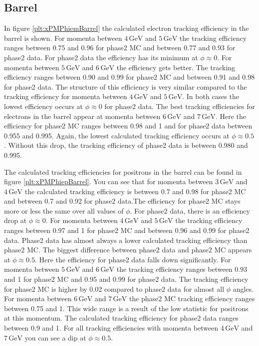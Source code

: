 \documentclass[a4paper,11pt,twosided,final,german,openbib,pdftex,listof=totoc,bibliography=totoc]{scrbook}
\begin{document}
\newpage



\subsection{Barrel}

In figure \ref{plt:xPMPhiemBarrel} the calculated electron tracking efficiency in the barrel is shown. For momenta between $4\,\textrm{GeV}$ and $5\,\textrm{GeV}$ the tracking efficiency ranges between 0.75 and 0.96 for phase2 MC and between 0.77 and 0.93 for phase2 data. For phase2 data the efficiency has its minimum at $\phi \approx 0$. For momenta between $5\,\textrm{GeV}$ and $6\,\textrm{GeV}$ the efficiency gets better. The tracking efficiency ranges between 0.90 and 0.99 for phase2 MC and between 0.91 and 0.98 for phase2 data. The structure of this efficiency is very similar compared to the tracking efficiency for momenta between $4\,\textrm{GeV}$ and $5\,\textrm{GeV}$. In both cases the lowest efficiency occurs at $\phi \approx 0$ for phase2 data. The best tracking efficiencies for electrons in the barrel appear at momenta between $6\,\textrm{GeV}$ and $7\,\textrm{GeV}$. Here the efficiency for phase2 MC ranges between 0.98 and 1 and for phase2 data between 0.955 and 0.995. Again, the lowest calculated tracking efficiency occurs at  $\phi \approx 0.5$. Without this drop, the tracking efficiency of phase2 data is between 0.980 and 0.995. 

The calculated tracking efficiencies for positrons in the barrel can be found in figure \ref{plt:xPMPhiepBarrel}. You can see that for momenta between $3\,\textrm{GeV}$ and $4\,\textrm{GeV}$ the calculated tracking efficiency is between 0.7 and 0.98 for phase2 MC and between 0.7 and 0.92 for phase2 data.The efficiency for phase2 MC stays more or less the same over all values of $\phi$. For phase2 data, there is an efficiency drop at $\phi \approx 0$.
For momenta between $4\,\textrm{GeV}$ and $5\,\textrm{GeV}$ the tracking efficiency ranges between 0.97 and 1 for phase2 MC and between 0.96 and 0.99 for phase2 data. Phase2 data has almost always a lower calculated tracking efficiency than phase2 MC.
The biggest difference between phase2 data and phase2 MC appears at $\phi \approx 0.5$. Here the efficiency for phase2 data falls down significantly. 
For momenta between $5\,\textrm{GeV}$ and $6\,\textrm{GeV}$ the tracking efficiency ranges between 0.93 and 1 for phase2 MC and 0.95  and 0.99 for phase2 data. The tracking efficiency for phase2 MC is higher by 0.02 compared to phase2 data for almost all $\phi$ angles. 
For momenta between $6\,\textrm{GeV}$ and $7\,\textrm{GeV}$ the phase2 MC tracking efficiency ranges between 0.75 and 1. This wide range is a result of the low statistic for positrons at this momentum. The calculated tracking efficiency for phase2 data ranges between 0.9 and 1. For all tracking efficiencies with momenta between $4\,\textrm{GeV}$ and $7\,\textrm{GeV}$ you can see a dip at $\phi \approx 0.5$.
\end{document}
